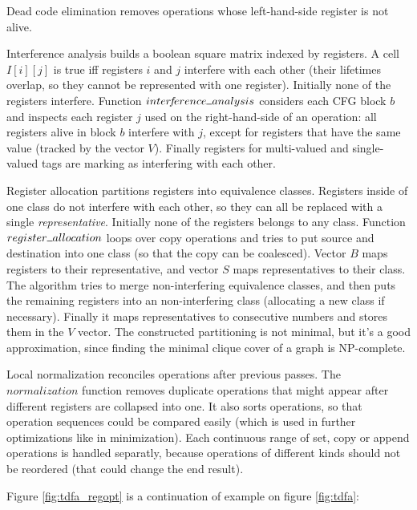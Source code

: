 \documentclass[]{article}
\newcommand{\Xund}{\rule{.5em}{.5pt}}
\begin{document}
Dead code elimination removes operations whose left-hand-side register is not alive.
\medskip

Interference analysis builds a boolean square matrix indexed by registers.
A cell $I[i][j]$ is true iff registers $i$ and $j$ interfere with each other
(their lifetimes overlap, so they cannot be represented with one register).
Initially none of the registers interfere.
Function $inter\!f\!erence \Xund analysis$ considers each CFG block $b$ and inspects each register $j$ used on the right-hand-side of an operation:
all registers alive in block $b$ interfere with $j$,
except for registers that have the same value (tracked by the vector $V$).
Finally registers for multi-valued and single-valued tags are marking as interfering with each other.
\medskip

Register allocation partitions registers into equivalence classes.
Registers inside of one class do not interfere with each other, so they can all be replaced with a single \emph{representative}.
Initially none of the registers belongs to any class.
Function $register \Xund allocation$ loops over copy operations
and tries to put source and destination into one class (so that the copy can be coalesced).
Vector $B$ maps registers to their representative, and vector $S$ maps representatives to their class.
The algorithm tries to merge non-interfering equivalence classes,
and then puts the remaining registers into an non-interfering class (allocating a new class if necessary).
Finally it maps representatives to consecutive numbers and stores them in the $V$ vector.
The constructed partitioning is not minimal, but it's a good approximation,
since finding the minimal clique cover of a graph is NP-complete.
\medskip

Local normalization reconciles operations after previous passes.
The $normalization$ function removes duplicate operations that might appear after different registers are collapsed into one.
It also sorts operations, so that operation sequences could be compared easily
(which is used in further optimizations like in minimization).
Each continuous range of set, copy or append operations is handled separatly,
because operations of different kinds should not be reordered (that could change the end result).
\medskip

Figure \ref{fig:tdfa_regopt} is a continuation of example on figure \ref{fig:tdfa}:
\medskip
\end{document}
